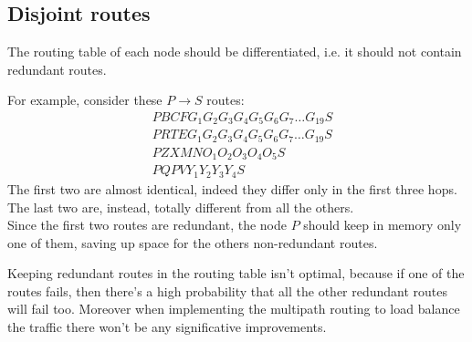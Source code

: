 \documentclass[a4paper]{article}
\begin{document}
\subsection{Disjoint routes}
The routing table of each node should be differentiated, i.e. it should not
contain redundant routes.

For example, consider these $P \rightarrow S$ routes:
\begin{align}
	& PBCFG_1G_2G_3G_4G_5G_6G_7 \dots G_{19} S	\\
	& PRTEG_1G_2G_3G_4G_5G_6G_7 \dots G_{19} S	\\
	& PZXMNO_1O_2O_3O_4O_5S				\\
	& PQPVY_1Y_2Y_3Y_4S
\end{align}
The first two are almost identical, indeed they differ only in the first three
hops. The last two are, instead, totally different from all the others.\\
Since the first two routes are redundant, the node $P$ should keep in memory only
one of them, saving up space for the others non-redundant routes.
\newline

Keeping redundant routes in the routing table isn't optimal, because if one of the
routes fails, then there's a high probability that all the other redundant
routes will fail too. Moreover when implementing the multipath routing to load
balance the traffic there won't be any significative improvements.
\newline
\end{document}
